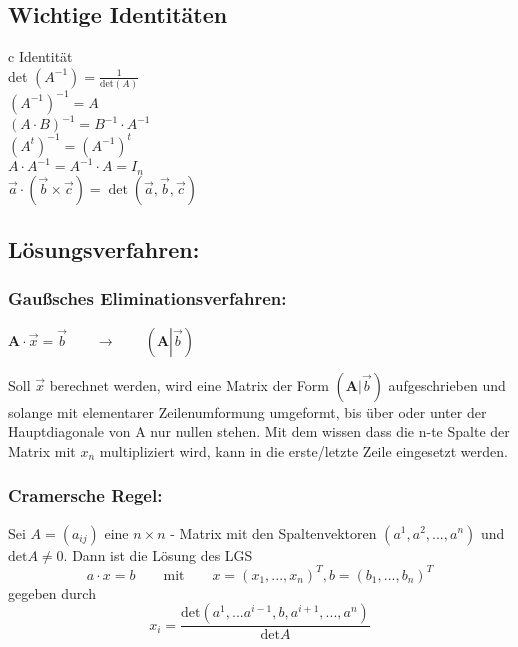 \subsection{Wichtige Identitäten}
\begin{center}
    \begin{tblr}{c}
        Identität \\ \hline[1.5pt]
        det $(A^{-1})= \frac{1}{\text{det}(A)}$\\ \hline
        $(A^{-1})^{-1} = A$ \\ \hline
        $(A\cdot B)^{-1}=B^{-1}\cdot A^{-1}$ \\ \hline 
        $(A^t)^{-1}=(A^{-1})^t$ \\ \hline
        $A\cdot A^{-1}=A^{-1}\cdot A=I_n$ \\ \hline 
        $\vec{a}\cdot (\vec{b}\times \vec{c})=\det(\vec{a}, \vec{b}, \vec{c})$\\ \hline
    \end{tblr}
\end{center}



\subsection{Lösungsverfahren:}
\subsubsection{Gaußsches Eliminationsverfahren:}

$\mathbf{A}\cdot \vec{x} =\vec{b}\qquad\rightarrow \qquad \left (\mathbf{A} \left | \vec{b}\right ) \right .$

Soll $\vec{x}$ berechnet werden, wird eine Matrix der Form $(\mathbf{A}|\vec{b})$ aufgeschrieben und solange mit elementarer Zeilenumformung umgeformt, bis über oder unter der Hauptdiagonale von A nur nullen stehen. Mit dem wissen dass die n-te Spalte der Matrix mit $x_n$ multipliziert wird, kann in die erste/letzte Zeile eingesetzt werden.


\subsubsection{Cramersche Regel:}
Sei $A=(a_{ij})$ eine $n\times n$ - Matrix mit den Spaltenvektoren $(a^1,a^2,...,a^n)$ und $\text{det}A\neq 0$. Dann ist die Lösung des LGS
\[a\cdot x = b \qquad \text{mit} \qquad x = (x_1, ... , x_n)^T, b=(b_1,...,b_n)^T\]
gegeben durch
\[x_i=\frac{\text{det}(a^1,...a^{i-1}, b, a^{i+1},...,a^n)}{\text{det}A}\]

